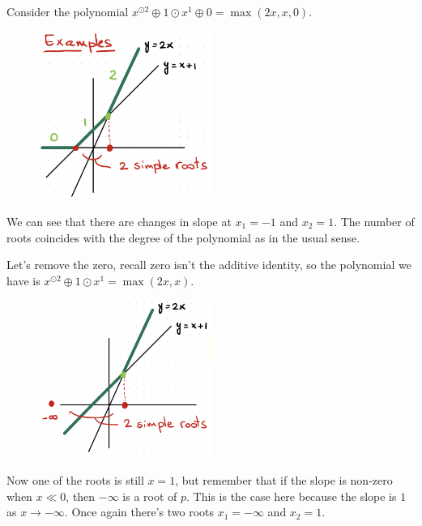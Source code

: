 \documentclass[12pt]{memoir}
\begin{document}
\begin{Ex}
    Consider the polynomial $x^{\odot2}\oplus1\odot x^1\oplus 0=\max(2x,x,0)$.
    \begin{figure}[h!]
        \centering
        \includegraphics[width=0.5\textwidth]{figs/fig3-3SimpleFiniteRootsTropicalPolynomial.png}
        \label{fig:3.3-SimpleFiniteRoots}
    \end{figure}
    We can see that there are changes in slope at $x_1=-1$ and $x_2=1$. The number of roots coincides with the degree of the polynomial as in the usual sense.
\end{Ex}

\begin{Ex}
    Let's remove the zero, recall zero isn't the additive identity, so the polynomial we have is $x^{\odot2}\oplus1\odot x^1=\max(2x,x)$.
    \begin{figure}[h!]
        \centering
        \includegraphics[width=0.5\textwidth]{figs/fig3-4SimpleRootsTropicalPolynomial.png}
        \label{fig:3.4-OneFiniteRootOneInfiniteRoot}
    \end{figure}
    Now one of the roots is still $x=1$, but remember that if the slope is non-zero when $x\ll 0$, then $-\infty$ is a root of $p$. This is the case here because the slope is $1$ as $x\to-\infty$. Once again there's two roots $x_1=-\infty$ and $x_2=1$.
\end{Ex}
\end{document}
